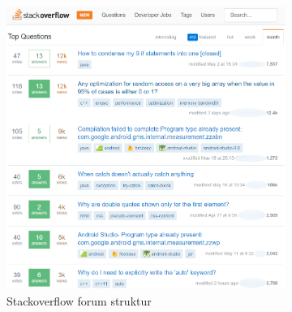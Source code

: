 \begin{figure}[H]
    \begin{subfigure}{0.5\textwidth}
        \centering
        \includegraphics[width=1.0\linewidth ]{Projectdoc/Assets/Illustrationer/stackoverflow_forum_eksempel.png} 
        \caption{Stackoverflow forum struktur}
        \label{fig:stackoverflow_forum}
    \end{subfigure}
    \begin{subfigure}{0.5\textwidth}
        \centering

\end{subfigure}
\end{figure}
